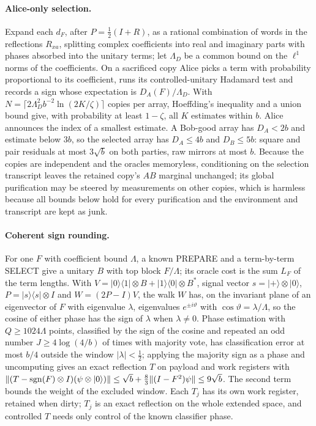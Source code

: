 \paragraph{Alice-only selection.} Expand each $d_F$, after $P=\frac12(I+R)$, as a rational combination of words in the
reflections $R_{xa}$, splitting complex coefficients into real and imaginary parts with phases absorbed into the unitary
terms; let $\Lambda_D$ be a common bound on the $\ell^1$ norms of the coefficients. On a sacrificed copy Alice picks a term
with probability proportional to its coefficient, runs its controlled-unitary Hadamard test and records a sign whose
expectation is $D_A(F)/\Lambda_D$. With $N=\lceil2\Lambda_D^2b^{-2}\ln(2K/\zeta)\rceil$ copies per array, Hoeffding's inequality
and a union bound give, with probability at least $1-\zeta$, all $K$ estimates within $b$. Alice announces the index of a
smallest estimate. A Bob-good array has $D_A<2b$ and estimate below $3b$, so the selected array has $D_A\le4b$ and
$D_B\le5b$: square and pair residuals at most $3\sqrt b$ on both parties, raw mirrors at most $b$. Because the copies are
independent and the oracles memoryless, conditioning on the selection transcript leaves the retained copy's $AB$
marginal unchanged; its global purification may be steered by measurements on other copies, which is harmless because all
bounds below hold for every purification and the environment and transcript are kept as junk.

\paragraph{Coherent sign rounding.} For one $F$ with coefficient bound $\Lambda$, a known PREPARE and a term-by-term
SELECT give a unitary $B$ with top block $F/\Lambda$; its oracle cost is the sum $L_F$ of the term lengths. With
$V=|0\rangle\langle1|\otimes B+|1\rangle\langle0|\otimes B^*$, signal vector $s=|+\rangle\otimes|0\rangle$, $P=|s\rangle\langle s|\otimes I$
and $W=(2P-I)V$, the walk $W$ has, on the invariant plane of an eigenvector of $F$ with eigenvalue $\lambda$, eigenvalues
$e^{\pm i\vartheta}$ with $\cos\vartheta=\lambda/\Lambda$, so the cosine of either phase has the sign of $\lambda$ when
$\lambda\ne0$. Phase estimation with $Q\ge1024\Lambda$
points, classified by the sign of the cosine and repeated an odd number $J\ge4\log(4/b)$ of times with majority vote, has
classification error at most $b/4$ outside the window $|\lambda|<\frac12$; applying the majority sign as a phase and
uncomputing gives an exact reflection $T$ on payload and work registers with
$\|(T-\operatorname{sgn}(F)\otimes I)(\psi\otimes|0\rangle)\|\le\sqrt b+\frac83\|(I-F^2)\psi\|\le9\sqrt b$. The second term bounds the weight
of the excluded window. Each $T_j$ has its own work register, retained when dirty; $T_j$ is an exact reflection on the
whole extended space, and controlled $T$ needs only control of the known classifier phase.

